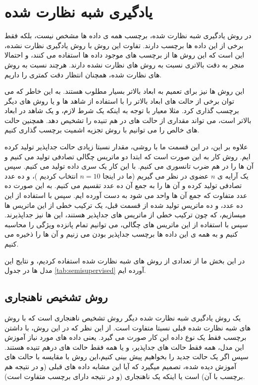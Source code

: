 \section{یادگیری شبه نظارت شده}

در روش یادگیری شبه نظارت شده، برچسب همه ی داده ها مشخص نیست، بلکه فقط برخی از این داده ها برچسب دارند. تفاوت این روش با روش یادگیری نظارت نشده، این است که این روش ها از برچسب های موجود داده ها استفاده می کنند، و احتمالا منجر به دقت بالاتری نسبت به روش های نظارت نشده دارند. هرچند نسبت به روش های نظارت شده، همچنان انتظار دقت  کمتری را داریم.

این روش ها نیز برای تعمیم به ابعاد بالاتر بسیار مطلوب هستند. به این خاطر که می توان برخی از حالت های ابعاد بالاتر را با استفاده از شاهد ها و یا روش های دیگر برچسب گذاری کرد. مثلا معیار
با توجه به اینکه یک شرط لازم، و یک شاهد در ابعاد بالاتر است، می تواند مقداری از حالت های در هم تنیده را تشخیص دهد. همچنین حالت های خالص را می توانیم با روش تجزیه اشمیت برچسب گذاری کنیم.

علاوه بر این، در این قسمت ما با روشی، مقدار نسبتا زیادی حالت جداپذیر تولید کرده ایم. روش کار به این صورت است که
ابتدا دو ماتریس چگالی تصادفی تولید می کنیم و آن ها را در هم ضرب تانسوری می کنیم. با این کار یک سری داده تولید می کنیم. سپس یک آرایه ی
$n$
عضوی در نظر می گیریم (‌ما در اینجا
$n=10$
انتخاب کردیم
)،
و ده عدد تصادفی تولید کرده و آن ها را به جمع آن ده عدد تقسیم می کنیم. به این صورت ده عدد متفاوت که جمع آن ها واحد می شود به دست آورده ایم. سپس با استفاده از این ده عدد، و ده ماتریس تولید شده از قسمت قبل، یک ترکیب خطی از این ماتریس ها میسازیم، که چون ترکیب خطی از ماتریس های جداپذیر هستند، ‌این ها نیز جداپذیرند. سپس با استفاده از این ماتریس های چگالی، می توانیم تمام پانزده ویژگی را محاسبه کنیم و به همه ی این داده ها برچسب جداپذیر بودن می زنیم و آن ها را ذخیره می کنیم.

در این بخش ما از تعدادی از روش های شبه نظارت شده استفاده کردیم، و نتایج این مدل ها در جدول
\ref{tab:semisupervised}
آورده ایم.

\subsection{روش تشخیص ناهنجاری}

یک روش یادگیری شبه نظارت شده دیگر روش تشخیص ناهنجاری است که با روش های شبه نظارت شده قبلی نسبتا متفاوت است. از این نظر که در این روش، با داشتن برچسب فقط یک نوع داده این کار صورت می گیرد. یعنی داده های مورد نیاز آموزش این مدل، همه فقط حالت های جداپذیر، و یا همه فقط حالت های درهم تنیده هستند. سپس اگر یک حالت جدید را بخواهیم پیش بینی کنیم،‌این روش با مقایسه با حالت های آموزش دیده شده، تصمیم میگیرد که آیا این مشابه داده های قبلی (و در نتیجه هم برچسب با آن) است یا اینکه یک ناهنجاری (و در نتیجه دارای برچسب متفاوت است).

